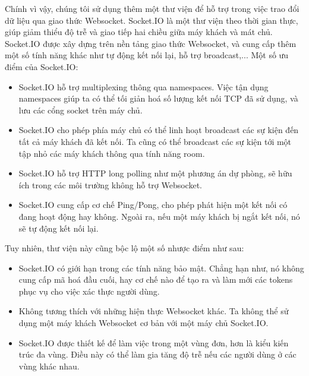 Chính vì vậy, chúng tôi sử dụng thêm một thư viện để hỗ trợ trong việc trao đổi dữ liệu qua giao thức Websocket.
Socket.IO là một thư viện theo thời gian thực, giúp giảm thiểu độ trễ và giao tiếp hai chiều giữa máy khách và mát chủ. Socket.IO được xây dựng trên nền tảng giao thức Websocket, và cung cấp thêm một số tính năng khác như tự động kết nối lại, hỗ trợ broadcast,...
Một số ưu điểm của Socket.IO:
\begin{itemize}
    \item Socket.IO hỗ trợ multiplexing thông qua namespaces. Việc tận dụng namespaces giúp ta có thể tối giản hoá số lượng kết nối TCP đã sử dụng, và lưu các cổng socket trên máy chủ.
    \item Socket.IO cho phép phía máy chủ có thể linh hoạt broadcast các sự kiện đến tất cả máy khách đã kết nối. Ta cũng có thể broadcast các sự kiện tới một tập nhỏ các máy khách thông qua tính năng room.
    \item Socket.IO hỗ trợ HTTP long polling như một phương án dự phòng, sẽ hữu ích trong các môi trường không hỗ trợ Websocket.
    \item Socket.IO cung cấp cơ chế Ping/Pong, cho phép phát hiện một kết nối có đang hoạt động hay không. Ngoài ra, nếu một máy khách bị ngắt kết nối, nó sẽ tự động kết nối lại.
\end{itemize}
Tuy nhiên, thư viện này cũng bộc lộ một số nhược điểm như sau:
\begin{itemize}
    \item Socket.IO có giới hạn trong các tính năng bảo mật. Chẳng hạn như, nó không cung cấp mã hoá đầu cuối, hay cơ chế nào để tạo ra và làm mới các tokens phục vụ cho việc xác thực người dùng.
    \item Không tương thích với những hiện thực Websocket khác. Ta không thể sử dụng một máy khách Websocket cơ bản với một máy chủ Socket.IO.
    \item Socket.IO được thiết kế để làm việc trong một vùng đơn, hơn là kiểu kiến trúc đa vùng. Điều này có thể làm gia tăng độ trễ nếu các người dùng ở các vùng khác nhau.
\end{itemize}

